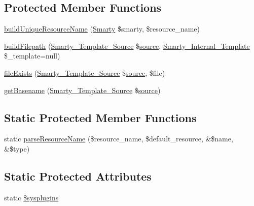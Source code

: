 \subsection*{Protected Member Functions}
\begin{DoxyCompactItemize}
\item 
\hyperlink{class_smarty___resource_acadaf10ca33c215a82372c1144f0fe4a}{build\+Unique\+Resource\+Name} (\hyperlink{class_smarty}{Smarty} \$smarty, \$resource\+\_\+name)
\item 
\hyperlink{class_smarty___resource_a67a18f7875dde23663f5ea3480eaa6c1}{build\+Filepath} (\hyperlink{class_smarty___template___source}{Smarty\+\_\+\+Template\+\_\+\+Source} \$\hyperlink{class_smarty___resource_ab6ac6b66dac2da6c41a178102f7d53e4}{source}, \hyperlink{class_smarty___internal___template}{Smarty\+\_\+\+Internal\+\_\+\+Template} \$\+\_\+template=null)
\item 
\hyperlink{class_smarty___resource_ab72388465ce255ceb259ea573558f79a}{file\+Exists} (\hyperlink{class_smarty___template___source}{Smarty\+\_\+\+Template\+\_\+\+Source} \$\hyperlink{class_smarty___resource_ab6ac6b66dac2da6c41a178102f7d53e4}{source}, \$file)
\item 
\hyperlink{class_smarty___resource_a91cdf7da12bdc51906539506dd26159b}{get\+Basename} (\hyperlink{class_smarty___template___source}{Smarty\+\_\+\+Template\+\_\+\+Source} \$\hyperlink{class_smarty___resource_ab6ac6b66dac2da6c41a178102f7d53e4}{source})
\end{DoxyCompactItemize}
\subsection*{Static Protected Member Functions}
\begin{DoxyCompactItemize}
\item 
static \hyperlink{class_smarty___resource_ae9253b4e64eb381742045450703b1555}{parse\+Resource\+Name} (\$resource\+\_\+name, \$default\+\_\+resource, \&\$name, \&\$type)
\end{DoxyCompactItemize}
\subsection*{Static Protected Attributes}
\begin{DoxyCompactItemize}
\item 
static \hyperlink{class_smarty___resource_a686d06923a58590ced2aae1c066d977e}{\$sysplugins}
\end{DoxyCompactItemize}


